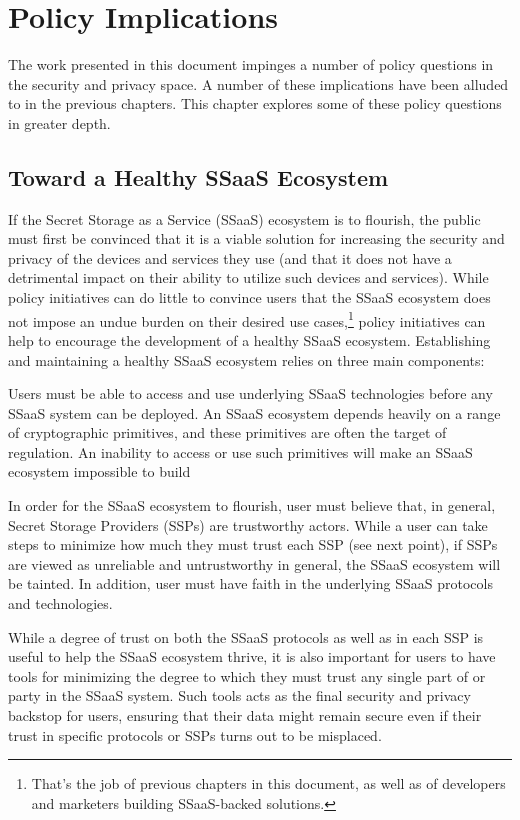 \chapter{Policy Implications}
\label{chap:policy}

The work presented in this document impinges a number of policy
questions in the security and privacy space. A number of these
implications have been alluded to in the previous chapters. This
chapter explores some of these policy questions in greater depth.

\section{Toward a Healthy SSaaS Ecosystem}

If the Secret Storage as a Service (SSaaS) ecosystem is to flourish,
the public must first be convinced that it is a viable solution for
increasing the security and privacy of the devices and services they
use (and that it does not have a detrimental impact on their ability
to utilize such devices and services). While policy initiatives can do
little to convince users that the SSaaS ecosystem does not impose an
undue burden on their desired use cases,\footnote{That's the job of
  previous chapters in this document, as well as of developers and
  marketers building SSaaS-backed solutions.} policy initiatives can
help to encourage the development of a healthy SSaaS
ecosystem. Establishing and maintaining a healthy SSaaS ecosystem
relies on three main components:

\begin{packed_desc}
\item[Availability of Cryptography:] Users must be able to access and
  use underlying SSaaS technologies before any SSaaS system can be
  deployed. An SSaaS ecosystem depends heavily on a range of
  cryptographic primitives, and these primitives are often the target
  of regulation. An inability to access or use such primitives will
  make an SSaaS ecosystem impossible to build
\item[Maximizing SSP Trustworthiness:] In order for the SSaaS
  ecosystem to flourish, user must believe that, in general, Secret
  Storage Providers (SSPs) are trustworthy actors. While a user can
  take steps to minimize how much they must trust each SSP (see next
  point), if SSPs are viewed as unreliable and untrustworthy in
  general, the SSaaS ecosystem will be tainted. In addition, user must
  have faith in the underlying SSaaS protocols and technologies.
\item[Minimizing Mandatory Trust:] While a degree of trust on both the
  SSaaS protocols as well as in each SSP is useful to help the SSaaS
  ecosystem thrive, it is also important for users to have tools for
  minimizing the degree to which they must trust any single part of or
  party in the SSaaS system. Such tools acts as the final security and
  privacy backstop for users, ensuring that their data might remain
  secure even if their trust in specific protocols or SSPs turns out
  to be misplaced.
\end{packed_desc}

